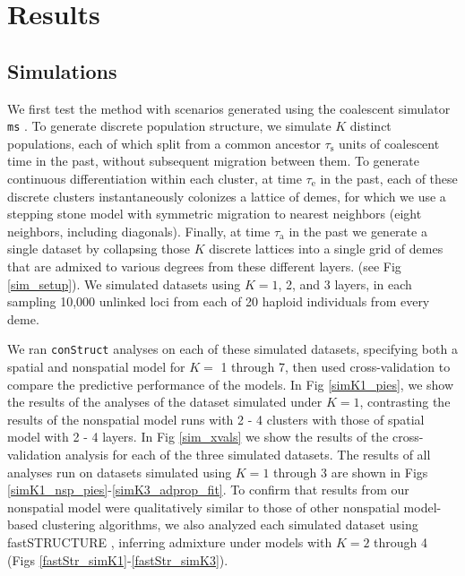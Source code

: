 \documentclass[12pt]{article}
\begin{document}
\section*{Results}

\subsection*{Simulations}
We first test the method with scenarios generated using the coalescent simulator \texttt{ms} \citep{Hudson2002}.
To generate discrete population structure, we simulate $K$ distinct populations,
each of which split from a common ancestor $\tau_{\text{s}}$ units of coalescent time in the past,
without subsequent migration between them.
To generate continuous differentiation within each cluster,
at time $\tau_{\text{e}}$ in the past,
each of these discrete clusters instantaneously colonizes a lattice of demes,
for which we use a stepping stone model with symmetric migration 
to nearest neighbors (eight neighbors, including diagonals).
Finally, at time $\tau_{\text{a}}$ in the past 
we generate a single dataset 
by collapsing those $K$ discrete lattices into a single grid of demes that are admixed to various degrees from these different layers.
(see Fig \ref{sim_setup}).
We simulated datasets using $K=1$, 2, and 3 layers,
in each sampling 10,000 unlinked loci from each of 20 haploid individuals from every deme.

We ran \texttt{conStruct} analyses on each of these simulated datasets, 
specifying both a spatial and nonspatial model for $K = $ 1 through 7, 
then used cross-validation to compare the predictive performance of the models.
In Fig \ref{simK1_pies}, we show the results of the analyses of the dataset simulated under $K=1$, 
contrasting the results of the nonspatial model runs with 2 - 4 clusters 
with those of spatial model with 2 - 4 layers.
In Fig \ref{sim_xvals} we show the results of the cross-validation analysis for each of the three simulated datasets.
The results of all analyses run on datasets simulated using $K=1$ through 3 are shown in 
Figs \ref{simK1_nsp_pies}-\ref{simK3_adprop_fit}.
To confirm that results from our nonspatial model were qualitatively similar to those of 
other nonspatial model-based clustering algorithms, 
we also analyzed each simulated dataset using fastSTRUCTURE \citep{fastStructure}, 
inferring admixture under models with $K=2$ through 4 (Figs \ref{fastStr_simK1}-\ref{fastStr_simK3}).
\end{document}
